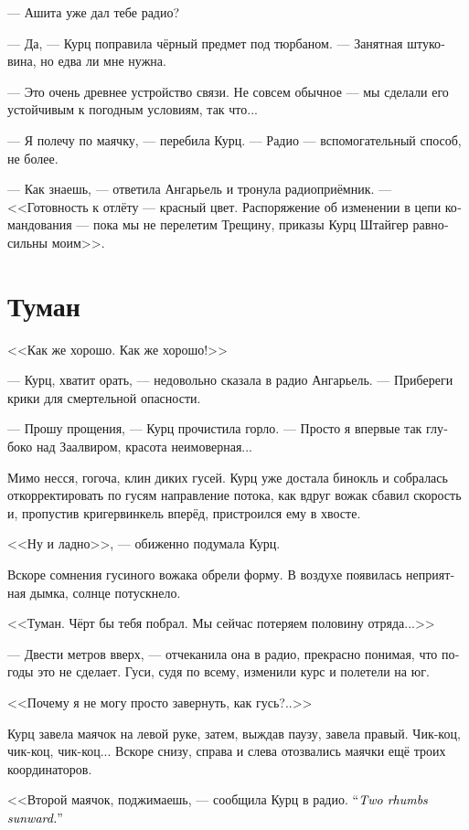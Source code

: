 \documentclass[a4paper,12pt,fleqn]{book}\usepackage{cooltooltips}\usepackage{polyglossia}\setdefaultlanguage[babelshorthands=true]{russian}\setotherlanguage{english}\defaultfontfeatures{Ligatures=TeX,Mapping=tex-text} \usepackage{xcolor}\definecolor{lightgray}{HTML}{bbbbbb}\color{lightgray}\newcommand{\ml}[3]{\textenglish{\textcolor{black}{#3}}}
\begin{document}
--- Ашита уже дал тебе радио?

--- Да, --- Курц поправила чёрный предмет под тюрбаном.
--- Занятная штуковина, но едва ли мне нужна.

--- Это очень древнее устройство связи.
Не совсем обычное --- мы сделали его устойчивым к погодным условиям, так что...

--- Я полечу по маячку, --- перебила Курц.
--- Радио --- вспомогательный способ, не более.

--- Как знаешь, --- ответила Ангарьель и тронула радиоприёмник.
--- <<Готовность к отлёту --- красный цвет.
Распоряжение об изменении в цепи командования --- пока мы не перелетим Трещину, приказы Курц Штайгер равносильны моим>>.

\section{Туман}

<<Как же хорошо.
Как же хорошо!>>

--- Курц, хватит орать, --- недовольно сказала в радио Ангарьель.
--- Прибереги крики для смертельной опасности.

--- Прошу прощения, --- Курц прочистила горло.
--- Просто я впервые так глубоко над Заалвиром, красота неимоверная...

Мимо несся, гогоча, клин диких гусей.
Курц уже достала бинокль и собралась откорректировать по гусям направление потока, как вдруг вожак сбавил скорость и, пропустив кригервинкель вперёд, пристроился ему в хвосте.

<<Ну и ладно>>, --- обиженно подумала Курц.

Вскоре сомнения гусиного вожака обрели форму.
В воздухе появилась неприятная дымка, солнце потускнело.

<<Туман.
Чёрт бы тебя побрал.
Мы сейчас потеряем половину отряда...>>

--- Двести метров вверх, --- отчеканила она в радио, прекрасно понимая, что погоды это не сделает.
Гуси, судя по всему, изменили курс и полетели на юг.

<<Почему я не могу просто завернуть, как гусь?..>>

Курц завела маячок на левой руке, затем, выждав паузу, завела правый.
Чик-коц, чик-коц, чик-коц...
Вскоре снизу, справа и слева отозвались маячки ещё троих координаторов.

<<Второй маячок, поджимаешь, --- сообщила Курц в радио.
\ml{$0$}
{--- Два румба посолонь>>.}
{``\textit{Two rhumbs sunward.}''}
\end{document}
